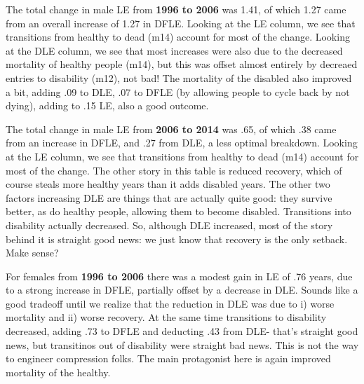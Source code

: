 The total change in male LE from \textbf{1996 to 2006} was 1.41, of which 1.27 came from an overall increase of 1.27 in DFLE. Looking at the LE column, we see that transitions from healthy to dead (m14) account for most of the change. Looking at the DLE column, we see that most increases were also due to the decreased mortality of healthy people (m14), but this was offset almost entirely by decreaed entries to disability (m12), not bad! The mortality of the disabled also improved a bit, adding .09 to DLE, .07 to DFLE (by allowing people to cycle back by not dying), adding to .15 LE, also a good outcome.

The total change in male LE from \textbf{2006 to 2014} was .65, of which .38 came from an increase in DFLE, and .27 from DLE, a less optimal breakdown. Looking at the LE column, we see that transitions from healthy to dead (m14) account for most of the change. The other story in this table is reduced recovery, which of course steals more healthy years than it adds disabled years. The other two factors increasing DLE are things that are actually quite good: they survive better, as do healthy people, allowing them to become disabled. Transitions into disability actually decreased. So, although DLE increased, most of the story behind it is straight good news: we just know that recovery is the only setback. Make sense?
\begin{table}[!ht]
      \caption{Males (all edu)}
      \label{tab:males}
      \centering
{}
     \qquad
{}
\end{table}

For females from \textbf{1996 to 2006} there was a modest gain in LE of .76 years, due to a strong increase in DFLE, partially offset by a decrease in DLE. Sounds like a good tradeoff until we realize that the reduction in DLE was due to i) worse mortality and ii) worse recovery. At the same time transitions to disability decreased, adding .73 to DFLE and deducting .43 from DLE- that's straight good news, but transitinos out of disability were straight bad news. This is not the way to engineer compression folks. The main protagonist here is again improved mortality of the healthy.

